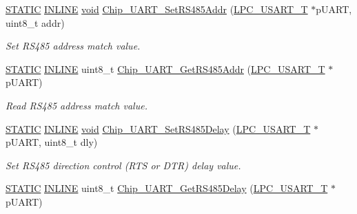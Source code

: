 \begin{DoxyCompactItemize}
\hyperlink{group__LPC__Types__Public__Macros_ga10b2d890d871e1489bb02b7e70d9bdfb}{S\-T\-A\-T\-I\-C} \hyperlink{group__LPC__Types__Public__Types_ga2eb6f9e0395b47b8d5e3eeae4fe0c116}{I\-N\-L\-I\-N\-E} \hyperlink{Paradigm_2Tern__EE_2small_2portmacro_8h_a14d32f8130d3c0b212cfc751730b5b49}{void} \hyperlink{group__UART__17XX__40XX_ga72a3d146a8d6f8a8276080f91c3703e1}{Chip\-\_\-\-U\-A\-R\-T\-\_\-\-Set\-R\-S485\-Addr} (\hyperlink{structLPC__USART__T}{L\-P\-C\-\_\-\-U\-S\-A\-R\-T\-\_\-\-T} $\ast$p\-U\-A\-R\-T, uint8\-\_\-t addr)
\begin{DoxyCompactList}\small\item\em Set R\-S485 address match value. \end{DoxyCompactList}\item 
\hyperlink{group__LPC__Types__Public__Macros_ga10b2d890d871e1489bb02b7e70d9bdfb}{S\-T\-A\-T\-I\-C} \hyperlink{group__LPC__Types__Public__Types_ga2eb6f9e0395b47b8d5e3eeae4fe0c116}{I\-N\-L\-I\-N\-E} uint8\-\_\-t \hyperlink{group__UART__17XX__40XX_ga1c96142bb767ca604ad468977c5e546c}{Chip\-\_\-\-U\-A\-R\-T\-\_\-\-Get\-R\-S485\-Addr} (\hyperlink{structLPC__USART__T}{L\-P\-C\-\_\-\-U\-S\-A\-R\-T\-\_\-\-T} $\ast$p\-U\-A\-R\-T)
\begin{DoxyCompactList}\small\item\em Read R\-S485 address match value. \end{DoxyCompactList}\item 
\hyperlink{group__LPC__Types__Public__Macros_ga10b2d890d871e1489bb02b7e70d9bdfb}{S\-T\-A\-T\-I\-C} \hyperlink{group__LPC__Types__Public__Types_ga2eb6f9e0395b47b8d5e3eeae4fe0c116}{I\-N\-L\-I\-N\-E} \hyperlink{Paradigm_2Tern__EE_2small_2portmacro_8h_a14d32f8130d3c0b212cfc751730b5b49}{void} \hyperlink{group__UART__17XX__40XX_ga4aa983b3f076828ee460a1c7146b3eac}{Chip\-\_\-\-U\-A\-R\-T\-\_\-\-Set\-R\-S485\-Delay} (\hyperlink{structLPC__USART__T}{L\-P\-C\-\_\-\-U\-S\-A\-R\-T\-\_\-\-T} $\ast$p\-U\-A\-R\-T, uint8\-\_\-t dly)
\begin{DoxyCompactList}\small\item\em Set R\-S485 direction control (R\-T\-S or D\-T\-R) delay value. \end{DoxyCompactList}\item 
\hyperlink{group__LPC__Types__Public__Macros_ga10b2d890d871e1489bb02b7e70d9bdfb}{S\-T\-A\-T\-I\-C} \hyperlink{group__LPC__Types__Public__Types_ga2eb6f9e0395b47b8d5e3eeae4fe0c116}{I\-N\-L\-I\-N\-E} uint8\-\_\-t \hyperlink{group__UART__17XX__40XX_ga5394200f985c69d25fd0c7434588cf88}{Chip\-\_\-\-U\-A\-R\-T\-\_\-\-Get\-R\-S485\-Delay} (\hyperlink{structLPC__USART__T}{L\-P\-C\-\_\-\-U\-S\-A\-R\-T\-\_\-\-T} $\ast$p\-U\-A\-R\-T)

\end{DoxyCompactItemize}
